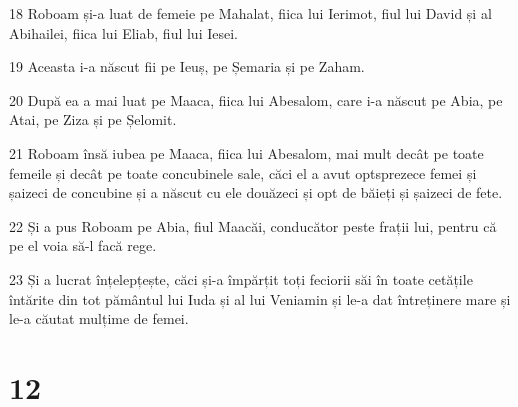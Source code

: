 \par 18 Roboam și-a luat de femeie pe Mahalat, fiica lui Ierimot, fiul lui David și al Abihailei, fiica lui Eliab, fiul lui Iesei.
\par 19 Aceasta i-a născut fii pe Ieuș, pe Șemaria și pe Zaham.
\par 20 După ea a mai luat pe Maaca, fiica lui Abesalom, care i-a născut pe Abia, pe Atai, pe Ziza și pe Șelomit.
\par 21 Roboam însă iubea pe Maaca, fiica lui Abesalom, mai mult decât pe toate femeile și decât pe toate concubinele sale, căci el a avut optsprezece femei și șaizeci de concubine și a născut cu ele douăzeci și opt de băieți și șaizeci de fete.
\par 22 Și a pus Roboam pe Abia, fiul Maacăi, conducător peste frații lui, pentru că pe el voia să-l facă rege.
\par 23 Și a lucrat înțelepțește, căci și-a împărțit toți feciorii săi în toate cetățile întărite din tot pământul lui Iuda și al lui Veniamin și le-a dat întreținere mare și le-a căutat mulțime de femei.

\chapter{12}

